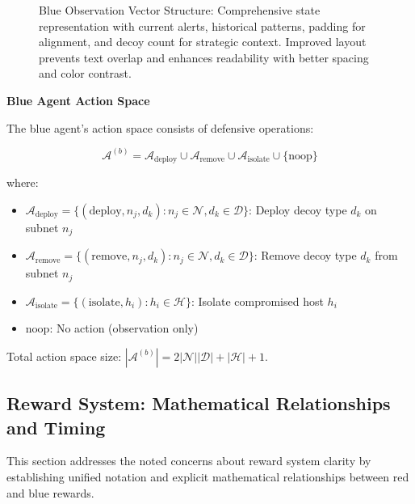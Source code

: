 \documentclass[12pt]{article}
\theoremstyle{definition}
\theoremstyle{plain}
\begin{document}
\begin{figure}[htbp]
\caption{Blue Observation Vector Structure: Comprehensive state representation with current alerts, historical patterns, padding for alignment, and decoy count for strategic context. Improved layout prevents text overlap and enhances readability with better spacing and color contrast.}
\label{fig:observation_vector}
\end{figure}

\textbf{Blue Agent Action Space}

The blue agent's action space consists of defensive operations:

\begin{equation}
\mathcal{A}^{(b)} = \mathcal{A}_{\text{deploy}} \cup \mathcal{A}_{\text{remove}} \cup \mathcal{A}_{\text{isolate}} \cup \{\text{noop}\}
\end{equation}

where:
\begin{itemize}
    \item $\mathcal{A}_{\text{deploy}} = \{(\text{deploy}, n_j, d_k) : n_j \in \mathcal{N}, d_k \in \mathcal{D}\}$: Deploy decoy type $d_k$ on subnet $n_j$
    \item $\mathcal{A}_{\text{remove}} = \{(\text{remove}, n_j, d_k) : n_j \in \mathcal{N}, d_k \in \mathcal{D}\}$: Remove decoy type $d_k$ from subnet $n_j$
    \item $\mathcal{A}_{\text{isolate}} = \{(\text{isolate}, h_i) : h_i \in \mathcal{H}\}$: Isolate compromised host $h_i$
    \item $\text{noop}$: No action (observation only)
\end{itemize}

Total action space size: $|\mathcal{A}^{(b)}| = 2|\mathcal{N}||\mathcal{D}| + |\mathcal{H}| + 1$.

\subsection{Reward System: Mathematical Relationships and Timing}

This section addresses the noted concerns about reward system clarity by establishing unified notation and explicit mathematical relationships between red and blue rewards.
\end{document}
